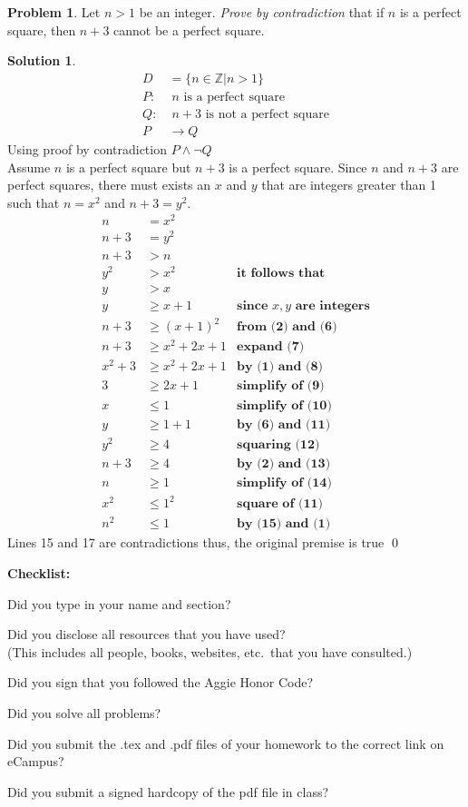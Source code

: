 \documentclass{article}
\theoremstyle{definition}
\newtheorem{problem}{Problem}
\newtheorem*{solution}{Solution}
\newcommand{\checklist}{\noindent\textbf{Checklist:}
\begin{compactitem}[$\Box$] 
\item Did you type in your name and section? 
\item Did you disclose all resources that you have used? \\
(This includes all people, books, websites, etc.\ that you have consulted.)
\item Did you sign that you followed the Aggie Honor Code? 
\item Did you solve all problems? 
\item Did you submit the .tex and .pdf files of your homework to the correct link on eCampus?
\item Did you submit a signed hardcopy of the pdf file in class? 
\end{compactitem}
}
\begin{document}
\begin{problem} Let $n>1$ be an integer. \textsl{Prove by contradiction} that 
if $n$ is a perfect square, then $n+3$ cannot be a perfect square. 
\end{problem}
\begin{solution}
\begin{align*}
  D &= \{n \in \mathbb{Z} | n > 1\} \\
  P:& \; n \text{ is a perfect square} \\
  Q:&\;  n+3 \text{ is not a perfect square} \\
  P &\rightarrow Q
\end{align*}
Using proof by contradiction $P \land \lnot Q$ \\
Assume $n$ is a perfect square but $n+3$ is a perfect square. Since $n$ and $n+3$ are perfect squares, there must exists an $x$ and $y$ that are integers greater than 1 such that $n=x^2$ and $n+3=y^2$.
\setcounter{equation}{0}
\begin{align}
  n &= x^2 \\
  n + 3 &= y^2 \\
  n+3 &> n \\
  y^2 &> x^2 & \textbf{it follows that} \\
  y &> x \\
  y &\geq x + 1 &\textbf{since $x,y$ are integers}\\
  n+3 &\geq (x+1)^2 & \textbf{from (2) and (6)} \\
  n+3 &\geq x^2 + 2x + 1 & \textbf{expand (7)} \\
  x^2 + 3 &\geq x^2 + 2x + 1 &\textbf{by (1) and (8)} \\
  3 &\geq 2x + 1 &\textbf{simplify of (9)} \\
  x &\leq 1 &\textbf{simplify of (10)} \\
  y &\geq 1 + 1 &\textbf{by (6) and (11)} \\
  y^2 &\geq 4 &\textbf{squaring (12)} \\
  n + 3 &\geq 4 &\textbf{by (2) and (13)} \\
  n &\geq 1 &\textbf{simplify of (14)} \\
  x^2 &\leq 1^2 &\textbf{square of (11)} \\
  n^2 &\leq 1 &\textbf{by (15) and (1)}
\end{align}
Lines 15 and 17 are contradictions thus, the original premise is true \qed
\end{solution}

\goodbreak
\checklist
\end{document}
